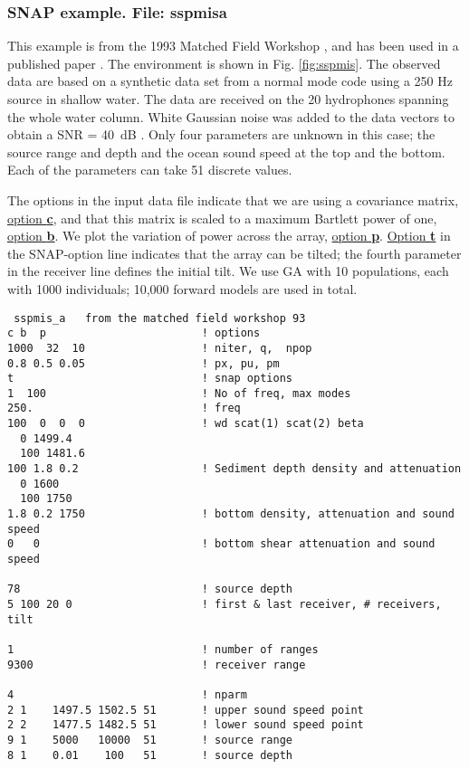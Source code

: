 \documentclass{saclantc}
\begin{document}
\subsubsection{SNAP example. File: {\bf sspmisa}}
\label{se:ssp} This example is from the 1993  Matched Field Workshop
\cite{porter:jca94}, and has been used in a published paper 
\cite{gerstoft:jca94}.
The environment is shown in Fig. \ref{fig:sspmis}.
The observed data are based on a synthetic  data set from a normal mode
code using a 250 Hz source in shallow water. The data are received on
the 20 hydrophones spanning the whole water column. 
White Gaussian noise   was added to the data vectors to obtain a
SNR = 40~dB \cite{porter:jca94}. 
Only four parameters are unknown in this case; the source range and
depth and the ocean sound speed at the top and the bottom.
 Each of the parameters can take 51 discrete values.

The options in the input data file indicate that we are using a
covariance matrix, \underline{option {\bf c}}, and that this
matrix is scaled to a maximum Bartlett power of one, \underline{option
{\bf b}}. We plot the
variation of power across the array, \underline{option {\bf p}}. 
\underline{Option {\bf t}} in the {\sf SNAP}-option
line indicates that the
array can be tilted; the fourth parameter in the receiver line defines
the initial tilt.  We use GA with 10 populations,
each with 1000 individuals; 10,000 forward models are used in total.

\small
\begin{verbatim}
 sspmis_a   from the matched field workshop 93
c b  p                        ! options
1000  32  10                  ! niter, q,  npop
0.8 0.5 0.05                  ! px, pu, pm
t                             ! snap options
1  100                        ! No of freq, max modes 
250.                          ! freq
100  0  0  0                  ! wd scat(1) scat(2) beta
  0 1499.4  
  100 1481.6 
100 1.8 0.2                   ! Sediment depth density and attenuation
  0 1600                      
  100 1750
1.8 0.2 1750                  ! bottom density, attenuation and sound speed
0   0                         ! bottom shear attenuation and sound speed

78                            ! source depth
5 100 20 0                    ! first & last receiver, # receivers, tilt

1                             ! number of ranges
9300                          ! receiver range

4                             ! nparm 
2 1    1497.5 1502.5 51       ! upper sound speed point
2 2    1477.5 1482.5 51       ! lower sound speed point
9 1    5000   10000  51       ! source range
8 1    0.01    100   51       ! source depth 
\end{verbatim}
\normalsize
\end{document}
